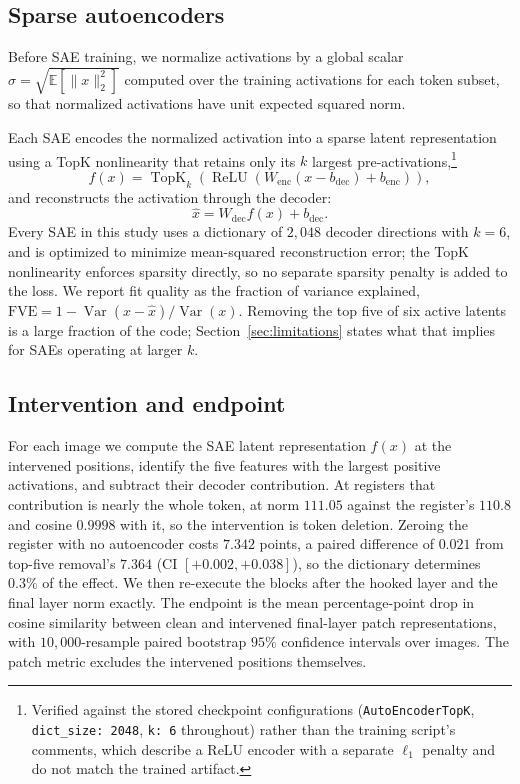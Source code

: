\documentclass{article}
\begin{document}
\subsection{Sparse autoencoders}
Before SAE training, we normalize activations by a global scalar $\sigma = \sqrt{\mathbb{E}[\|x\|_2^2]}$ computed over the training activations for each token subset, so that normalized activations have unit expected squared norm.

Each SAE encodes the normalized activation into a sparse latent representation using a TopK nonlinearity that retains only its $k$ largest pre-activations,\footnote{Verified against the stored checkpoint configurations (\texttt{AutoEncoderTopK}, \texttt{dict\_size: 2048}, \texttt{k: 6} throughout) rather than the training script's comments, which describe a ReLU encoder with a separate $\ell_1$ penalty and do not match the trained artifact.}
\[f(x) = \operatorname{TopK}_{k}\!\left(\operatorname{ReLU}\left(W_{\mathrm{enc}}(x - b_{\mathrm{dec}}) + b_{\mathrm{enc}}\right)\right),\]
and reconstructs the activation through the decoder:
\[\hat{x} = W_{\mathrm{dec}} f(x) + b_{\mathrm{dec}} .\]
Every SAE in this study uses a dictionary of $2{,}048$ decoder directions with $k=6$, and is optimized to minimize mean-squared reconstruction error; the TopK nonlinearity enforces sparsity directly, so no separate sparsity penalty is added to the loss. We report fit quality as the fraction of variance explained, $\mathrm{FVE} = 1 - \operatorname{Var}(x - \hat{x}) / \operatorname{Var}(x)$. Removing the top five of six active latents is a large fraction of the code; Section~\ref{sec:limitations} states what that implies for SAEs operating at larger $k$.

\subsection{Intervention and endpoint}
\label{sec:intervention}

For each image we compute the SAE latent representation $f(x)$ at the intervened positions, identify the five features with the largest positive activations, and subtract their decoder contribution. At registers that contribution is nearly the whole token, at norm $111.05$ against the register's $110.8$ and cosine $0.9998$ with it, so the intervention is token deletion. Zeroing the register with no autoencoder costs $7.342$ points, a paired difference of $0.021$ from top-five removal's $7.364$ (CI $[+0.002,+0.038]$), so the dictionary determines $0.3\%$ of the effect. We then re-execute the blocks after the hooked layer and the final layer norm exactly. The endpoint is the mean percentage-point drop in cosine similarity between clean and intervened final-layer patch representations, with $10{,}000$-resample paired bootstrap $95\%$ confidence intervals over images. The patch metric excludes the intervened positions themselves.
\end{document}
